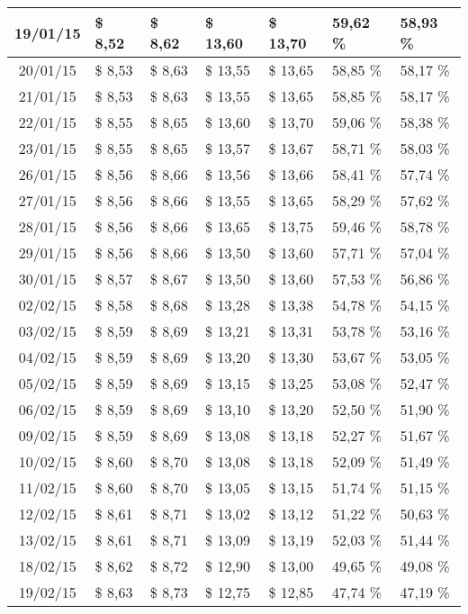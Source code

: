 \begin{center}
\begin{longtable}{|c|p{1.5cm}|p{1.5cm}|p{1.5cm}|p{1.5cm}|p{1.5cm}|p{1.5cm}|}
19/01/15 & \$ 8,52 & \$ 8,62 & \$ 13,60 & \$ 13,70 & 59,62 \% & 58,93 \% \\ \hline
20/01/15 & \$ 8,53 & \$ 8,63 & \$ 13,55 & \$ 13,65 & 58,85 \% & 58,17 \% \\ \hline
21/01/15 & \$ 8,53 & \$ 8,63 & \$ 13,55 & \$ 13,65 & 58,85 \% & 58,17 \% \\ \hline
22/01/15 & \$ 8,55 & \$ 8,65 & \$ 13,60 & \$ 13,70 & 59,06 \% & 58,38 \% \\ \hline
23/01/15 & \$ 8,55 & \$ 8,65 & \$ 13,57 & \$ 13,67 & 58,71 \% & 58,03 \% \\ \hline
26/01/15 & \$ 8,56 & \$ 8,66 & \$ 13,56 & \$ 13,66 & 58,41 \% & 57,74 \% \\ \hline
27/01/15 & \$ 8,56 & \$ 8,66 & \$ 13,55 & \$ 13,65 & 58,29 \% & 57,62 \% \\ \hline
28/01/15 & \$ 8,56 & \$ 8,66 & \$ 13,65 & \$ 13,75 & 59,46 \% & 58,78 \% \\ \hline
29/01/15 & \$ 8,56 & \$ 8,66 & \$ 13,50 & \$ 13,60 & 57,71 \% & 57,04 \% \\ \hline
30/01/15 & \$ 8,57 & \$ 8,67 & \$ 13,50 & \$ 13,60 & 57,53 \% & 56,86 \% \\ \hline
02/02/15 & \$ 8,58 & \$ 8,68 & \$ 13,28 & \$ 13,38 & 54,78 \% & 54,15 \% \\ \hline
03/02/15 & \$ 8,59 & \$ 8,69 & \$ 13,21 & \$ 13,31 & 53,78 \% & 53,16 \% \\ \hline
04/02/15 & \$ 8,59 & \$ 8,69 & \$ 13,20 & \$ 13,30 & 53,67 \% & 53,05 \% \\ \hline
05/02/15 & \$ 8,59 & \$ 8,69 & \$ 13,15 & \$ 13,25 & 53,08 \% & 52,47 \% \\ \hline
06/02/15 & \$ 8,59 & \$ 8,69 & \$ 13,10 & \$ 13,20 & 52,50 \% & 51,90 \% \\ \hline
09/02/15 & \$ 8,59 & \$ 8,69 & \$ 13,08 & \$ 13,18 & 52,27 \% & 51,67 \% \\ \hline
10/02/15 & \$ 8,60 & \$ 8,70 & \$ 13,08 & \$ 13,18 & 52,09 \% & 51,49 \% \\ \hline
11/02/15 & \$ 8,60 & \$ 8,70 & \$ 13,05 & \$ 13,15 & 51,74 \% & 51,15 \% \\ \hline
12/02/15 & \$ 8,61 & \$ 8,71 & \$ 13,02 & \$ 13,12 & 51,22 \% & 50,63 \% \\ \hline
13/02/15 & \$ 8,61 & \$ 8,71 & \$ 13,09 & \$ 13,19 & 52,03 \% & 51,44 \% \\ \hline
18/02/15 & \$ 8,62 & \$ 8,72 & \$ 12,90 & \$ 13,00 & 49,65 \% & 49,08 \% \\ \hline
19/02/15 & \$ 8,63 & \$ 8,73 & \$ 12,75 & \$ 12,85 & 47,74 \% & 47,19 \% \\ \hline

\end{longtable}
\end{center}
